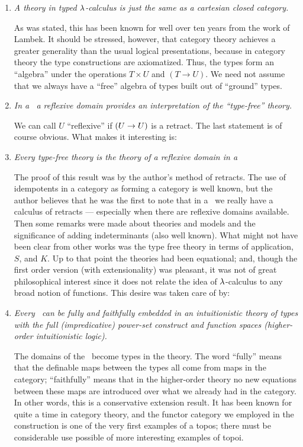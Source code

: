 \begin{enumerate}

\item {\it A theory in typed $\lambda$-calculus is just the same as a cartesian closed category.}

As was stated, this has been known for well over ten years from the work of Lambek. It
should be stressed, however, that category theory achieves a greater generality than the
usual logical presentations, because in category theory the type constructions are
axiomatized. Thus, the types form an ``algebra'' under the operations $T \times U$ and
$(T\to U)$. We need not assume that we always have a ``free'' algebra of types built out
of ``ground'' types.

\item {\it In a \ccc\  a reflexive domain provides an interpretation of the ``type-free'' theory.}

We can call $U$ ``reflexive'' if $(U\rightarrow U)$ is a retract. The last statement is of course
obvious. What makes it interesting is:

\item {\it Every type-free theory is the theory of a reflexive domain in a \ccc}

The proof of this result was by the author's method of retracts. The use of idempotents in
a category as forming a category is well known, but the author believes that he was the
first to note that in a \ccc\  we really have a calculus of retracts --- especially when
there are reflexive domains available. Then some remarks were made about theories and
models and the significance of adding indeterminants (also well known). What might not
have been clear from other works was the type free theory in terms of application, $S$,
and $K$. Up to that point the theories had been equational; and, though the first order
version (with extensionality) was pleasant, it was not of great philosophical interest
since it does not relate the idea of $\lambda$-calculus to any broad notion of functions. This
desire was taken care of by:

\item {\it Every \ccc\  can be fully and faithfully embedded in an intuitionistic 
theory of types with the full (impredicative) power-set construct and function spaces 
(higher-order intuitionistic logic).}

The domains of the \ccc\  become types in the theory. The word ``fully'' means that the
definable maps between the types all come from maps in the category; ``faithfully'' means
that in the higher-order theory no new equations between these maps are introduced over
what we already had in the category. In other words, this is a conservative extension
result. It has been known for quite a time in category theory, and the functor category we
employed in the construction is one of the very first examples of a topos; there must be
considerable use possible of more interesting examples of topoi.


\end{enumerate}
